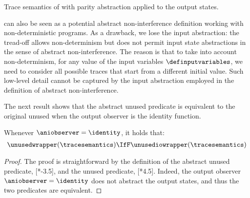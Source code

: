   \begin{marginfigure}[*2]
  \caption{Trace semantics of  with parity abstraction applied to the output states.}
  \end{marginfigure}

 can also be seen as a potential abstract non-interference definition working with non-deterministic programs.
As a drawback, we lose the input abstraction: the tread-off allows non-determinism but does not permit input state abstractions in the sense of abstract non-interference.
The reason is that to take into account non-determinism, for any value of the input variables $\definputvariables$, we need to consider all possible traces that start from a different initial value.
Such low-level detail cannot be captured by the input abstraction employed in the definition of abstract non-interference.

The next result shows that the abstract unused predicate is equivalent to the original unused when the output observer is the identity function.
\begin{proposition}
  Whenever $\aniobserver = \identity$, it holds that:
  \begin{gather*}
    \unusedwrapper(\tracesemantics) \IfF \unusediowrapper(\tracesemantics)
  \end{gather*}
\end{proposition}
\begin{proof}
  The proof is straightforward by the definition of the abstract unused predicate, [*-3.5], and the unused predicate, [*4.5].
  Indeed, the output observer $\aniobserver = \identity$ does not abstract the output states, and thus the two predicates are equivalent.
\end{proof}

